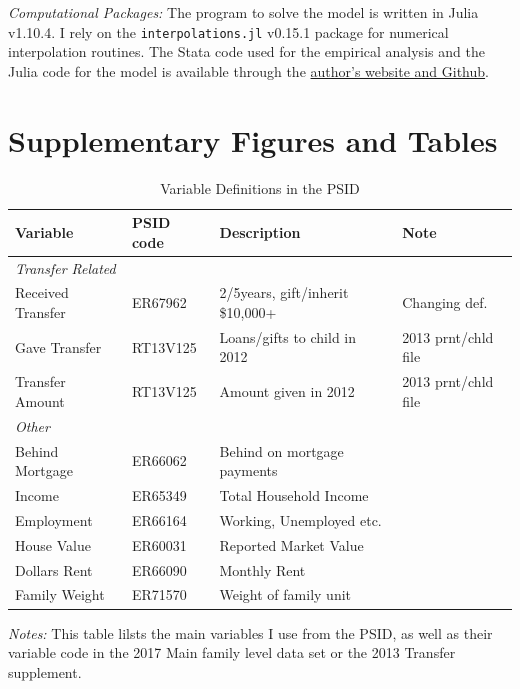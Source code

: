 \documentclass[12pt]{article}
\begin{document}
\textit{Computational Packages:}
The program to solve the model is written in Julia v1.10.4. I rely on the \texttt{interpolations.jl} v0.15.1 package for numerical interpolation routines. The Stata code used for the empirical analysis and the Julia code for the model is available through the \href{https://github.com/eirikbrandsaas/HomeownershipBankMomDad.jl}{author's website and Github}.



\section{Supplementary Figures and Tables}
\begin{table}
	\small	
	\caption{Variable Definitions in the PSID}\label{tab:vardef}
	\begin{threeparttable}
	\begin{tabular}{@{}llll@{}}
		\toprule
		Variable& PSID code & Description & Note \\ \midrule
		\textit{Transfer Related} \\ 
		Received Transfer & ER67962 & 2/5years, gift/inherit \$10,000+ & Changing def. \\
		Gave Transfer & RT13V125 & Loans/gifts to child in 2012 & 2013
		prnt/chld file \\ 
		Transfer Amount & RT13V125 & Amount given in 2012 & 2013 prnt/chld file \\
		\textit{Other} \\ 
		Behind Mortgage & ER66062 & Behind on mortgage payments\\
		Income & ER65349 & Total Household Income & \\
		Employment & ER66164 & Working, Unemployed etc. \\
		House Value & ER60031 & Reported Market Value & \\
		Dollars Rent &	ER66090 & Monthly Rent\\
		Family Weight &		ER71570 & Weight of family unit & \\
		\bottomrule
	\end{tabular}
	{\textit{Notes:} This table lilsts the main variables I use from the PSID, as well as their variable code in the 2017 Main family level data set or the 2013 Transfer supplement.}
	\end{threeparttable}
	
\end{table}
\end{document}

